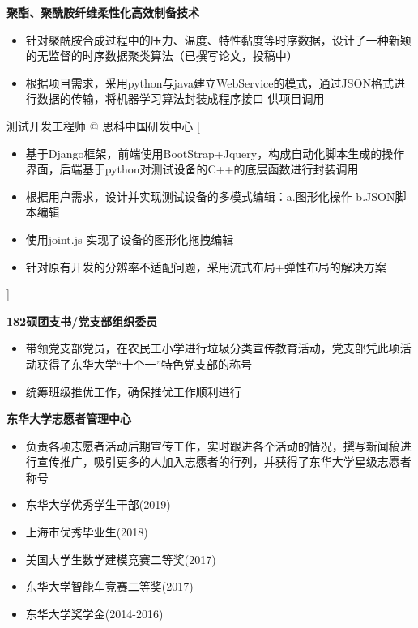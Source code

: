 \documentclass[zh]{resume}
\begin{document}
\textbf{聚酯、聚酰胺纤维柔性化高效制备技术}
\begin{itemize}
  \item 针对聚酰胺合成过程中的压力、温度、特性黏度等时序数据，设计了一种新颖的无监督的时序数据聚类算法（已撰写论文，投稿中）
  \item 根据项目需求，采用python与java建立WebService的模式，通过JSON格式进行数据的传输，将机器学习算法封装成程序接口 供项目调用
  
\end{itemize}


\begin{experiences}
    {测试开发工程师 @ 思科中国研发中心}%
    [\begin{itemize}
      \item 基于Django框架，前端使用BootStrap+Jquery，构成自动化脚本生成的操作界面，后端基于python对测试设备的C++的底层函数进行封装调用
      \item 根据用户需求，设计并实现测试设备的多模式编辑：a.图形化操作 b.JSON脚本编辑
      \item 使用joint.js 实现了设备的图形化拖拽编辑
      \item 针对原有开发的分辨率不适配问题，采用流式布局+弹性布局的解决方案
    \end{itemize}] 
\end{experiences}


\textbf{182硕团支书/党支部组织委员}
\begin{itemize}
  \item 带领党支部党员，在农民工小学进行垃圾分类宣传教育活动，党支部凭此项活动获得了东华大学“十个一”特色党支部的称号
  \item 统筹班级推优工作，确保推优工作顺利进行
\end{itemize}

\textbf{ 东华大学志愿者管理中心}
\begin{itemize}
  \item 负责各项志愿者活动后期宣传工作，实时跟进各个活动的情况，撰写新闻稿进行宣传推广，吸引更多的人加入志愿者的行列，并获得了东华大学星级志愿者称号 
\end{itemize}

\begin{itemize}
  \item 东华大学优秀学生干部(2019)
  \item 上海市优秀毕业生(2018)
  \item 美国大学生数学建模竞赛二等奖(2017)
  \item 东华大学智能车竞赛二等奖(2017)
  \item 东华大学奖学金(2014-2016)
\end{itemize}
\end{document}
